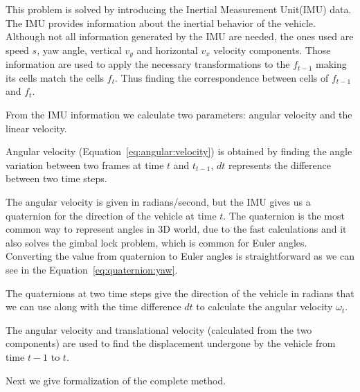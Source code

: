 This problem is solved by introducing the Inertial Measurement Unit(IMU) data. The IMU provides information about the inertial behavior of the vehicle. Although not all information generated by the IMU are needed, the ones used are speed $s$, yaw angle, vertical $v_y$ and horizontal $v_x$ velocity components. Those information are used to apply the necessary transformations to the $f_{t-1}$ making its cells match the cells $f_{t}$. Thus finding the correspondence between cells of $f_{t-1}$ and $f_{t}$.

From the IMU information we calculate two parameters: angular velocity and the linear velocity. 

Angular velocity (Equation~\ref{eq:angular:velocity}) is obtained by finding the angle variation between two frames at time $t$ and $t_{t-1}$, $dt$ represents the difference between two time steps.

The angular velocity is given in radians/second, but the IMU gives us a quaternion for the direction of the vehicle at time $t$. The quaternion is the most common way to represent angles in 3D world, due to the fast calculations and it also solves the gimbal lock problem, which is common for Euler angles. Converting the value from quaternion to Euler angles is straightforward as we can see in the Equation~\ref{eq:quaternion:yaw}.

The quaternions at two time steps give the direction of the vehicle in radians that we can use along with the time difference $dt$ to calculate the angular velocity $\omega_t$.

The angular velocity and translational velocity (calculated from the two components) are used to find the displacement undergone by the vehicle from time $t-1$ to $t$.



Next we give formalization of the complete method.

